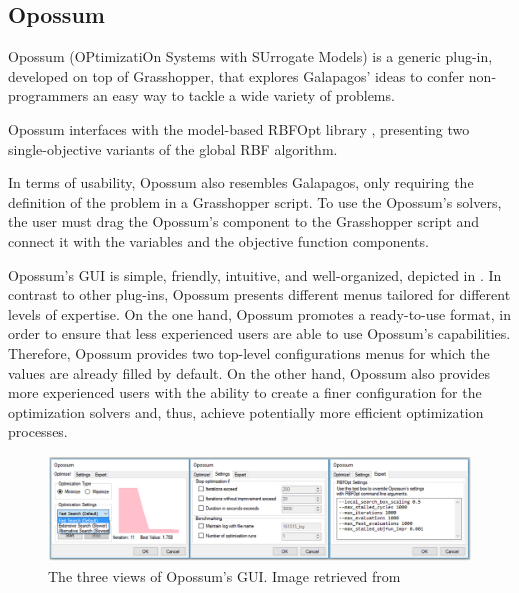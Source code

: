 	\subsection{Opossum}
	Opossum (OPtimizatiOn Systems with SUrrogate Models) \cite{Wortmann2017Opossum} is a generic plug-in, developed on top of Grasshopper, that explores Galapagos' ideas to confer non-programmers an easy way to tackle a wide variety of problems.
	
	Opossum interfaces with the model-based RBFOpt library \cite{RBFOPT}, presenting two single-objective variants of the global RBF algorithm. 
	
	In terms of usability, Opossum also resembles Galapagos, only requiring the definition of the problem in a Grasshopper script. To use the Opossum's solvers, the user must drag the Opossum's component to the Grasshopper script and connect it with the variables and the objective function components.
	
	Opossum's \ac{GUI} is simple, friendly, intuitive, and well-organized, depicted in . In contrast to other plug-ins, Opossum presents different menus tailored for different levels of expertise. On the one hand, Opossum promotes a ready-to-use format, in order to ensure that less experienced users are able to use Opossum's capabilities. Therefore, Opossum provides two top-level configurations menus for which the values are already filled by default. On the other hand, Opossum also provides more experienced users with the ability to create a finer configuration for the optimization solvers and, thus, achieve potentially more efficient optimization processes. 
	
	\begin{figure}
		\centering
		\includegraphics[width=1\textwidth]{Images/Background/Opossum/opossum_1.png}
		\caption[Opossum GUI]{The three views of Opossum's \ac{GUI}. Image retrieved from~\cite{Wortmann2017Opossum}}
		\label{fig:opossum}
	\end{figure}
	
